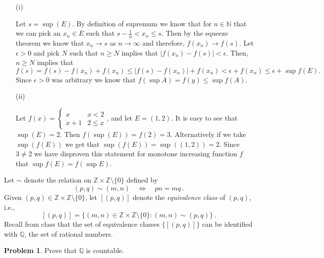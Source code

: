 \documentclass[11pt]{article}
\theoremstyle{definition}
\newtheorem{problem}{Problem}
\newcommand{\N}{\mathbb{N}}
\newcommand{\Z}{\mathbb{Z}}
\newcommand{\Q}{\mathbb{Q}}
\begin{document}
\begin{itemize}
    \item [(i)]
    
    Let $s = \sup(E)$. By definition of supremum we know that for $n\in \N$ that we can pick an $x_n\in E$ such that $s-\frac{1}{n}<x_n\leq s$. Then by the squeeze theorem we know that $x_n\rightarrow s$ as $n\rightarrow \infty$ and therefore, $f(x_n)\rightarrow f(s)$. Let $\epsilon > 0$ and pick $N$ such that $n\geq N$ implies that $|f(x_n)-f(s)| < \epsilon$. Then, $n\geq N$ implies that $f(s) = f(s)-f(x_n) + f(x_n)\leq |f(s)-f(x_n)| + f(x_n) < \epsilon + f(x_n) \leq \epsilon + \sup f(E).$ Since $\epsilon > 0$ was arbitrary we know that $f(\sup A) = f(y) \leq \sup f(A).$
    
    \item[(ii)]
    
    Let $f(x) = \begin{cases} 
      x & x< 2 \\
      x+1 & 2\leq x
   \end{cases}$, and let $E = (1,2).$ It is easy to see that $\sup(E) = 2.$ Then $f(\sup(E)) = f(2) = 3$. Alternatively if we take $\sup(f(E))$ we get that $\sup(f(E)) = \sup ((1,2)) = 2.$ Since $3\neq 2$ we have disproven this statement for monotone increasing function $f$ that $\sup f(E) = f(\sup E).$
    
\end{itemize}

\newpage

Let $\sim$ denote the relation on $\Z \times \Z \setminus \{0\}$ defined by 
\[
(p,q) \sim (m,n) \quad \iff \quad pn = mq \,.
\]
Given $(p,q) \in \Z \times \Z \setminus \{ 0 \}$, let $[(p,q)]$ denote the \emph{equivalence class} of $(p,q)$, i.e.,
\[
[(p,q)] = \{ (m,n) \in \Z \times \Z\setminus \{ 0\} : (m,n) \sim (p,q)\} \,. 
\]
Recall from class that the set of equivalence classes $\{ [(p,q)]\}$ can be 
identified with $\Q$, the set of rational numbers. 

\begin{problem}

Prove that $\Q$ is countable. 

\end{problem}
\end{document}
